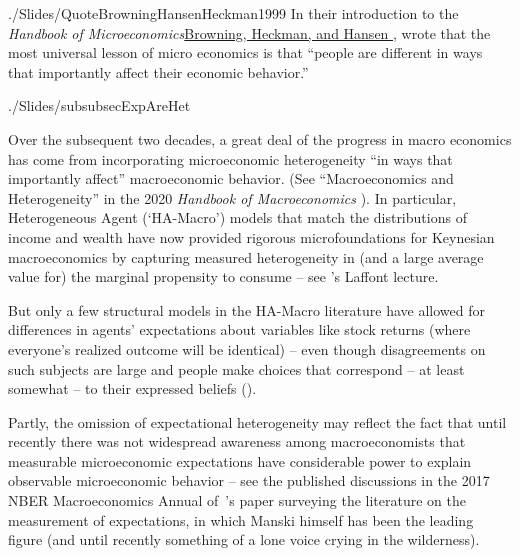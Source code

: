 \begin{verbatimwrite}{./Slides/QuoteBrowningHansenHeckman1999}%
    In their introduction to the \textit{Handbook of Microeconomics}\href{http://larspeterhansen.org/wp-content/uploads/2016/11/Microdata-and-GE-Models.pdf}{Browning, Heckman, and Hansen \citeyear{browning_chapter_1999}}, wrote that the most universal lesson of micro economics is that ``people are different in ways that importantly affect their economic behavior.''
\end{verbatimwrite}%
\begin{verbatimwrite}{./Slides/subsubsecExpAreHet}

\end{verbatimwrite}
    Over the subsequent two decades, a great deal of the progress in macro economics has come from incorporating microeconomic heterogeneity ``in ways that importantly affect'' macroeconomic behavior.  (See ``Macroeconomics and Heterogeneity'' in the 2020 \textit{Handbook of Macroeconomics} \cite{kmpHandbook}).  In particular, Heterogeneous Agent  (`HA-Macro') models that match the distributions of income and wealth
    have now provided rigorous microfoundations for Keynesian macroeconomics by capturing measured heterogeneity in (and a large average value for) the marginal propensity to consume -- see \cite{violante_marginal_2021}'s Laffont lecture.

    But only a few structural models in the HA-Macro literature have allowed for differences in agents' expectations about variables like stock returns (where everyone's realized outcome will be identical) -- even though disagreements on such subjects are large and people make choices that correspond -- at least somewhat --  to their expressed beliefs (\cite{gmsuBeliefs}).

    Partly, the omission of expectational heterogeneity may reflect the fact that until recently there was not widespread awareness among macroeconomists that measurable microeconomic expectations have considerable power to explain observable microeconomic behavior -- see the published discussions in the 2017 NBER Macroeconomics Annual of~\cite{manski2017survey}'s paper surveying the literature on the measurement of expectations, in which Manski himself has been the leading figure (and until recently something of a lone voice crying in the wilderness).%

